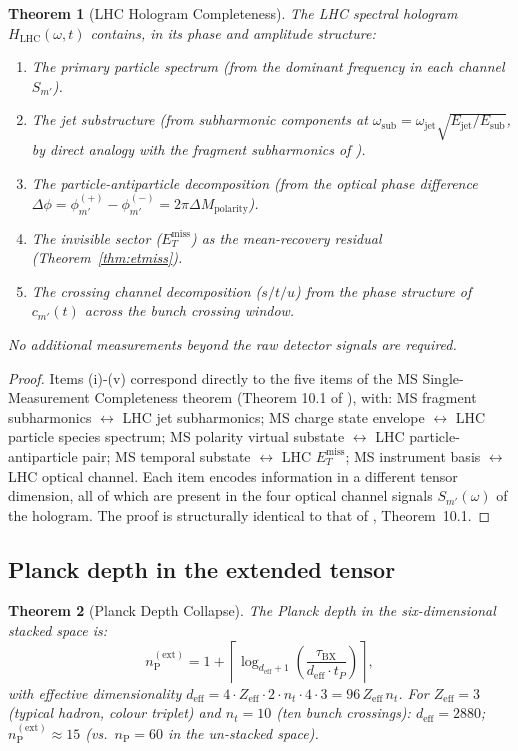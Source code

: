 \documentclass[twocolumn,10pt,a4paper]{article}
\theoremstyle{thmstyle}
\newtheorem{theorem}{Theorem}[section]
\theoremstyle{definition}
\theoremstyle{remark}
\newcommand{\nP}{n_{\mathrm{P}}}
\newcommand{\Hologram}{H_{\mathrm{LHC}}}
\newcommand{\deff}{d_{\mathrm{eff}}}
\newcommand{\ETmiss}{E_{T}^{\mathrm{miss}}}
\begin{document}
\begin{theorem}[LHC Hologram Completeness]
\label{thm:hologram_complete}
The LHC spectral hologram $\Hologram(\omega,t)$ contains, in its phase and
amplitude structure:
\begin{enumerate}[nosep,label=(\roman*)]
\item The primary particle spectrum (from the dominant frequency in each
  channel $S_{m'}$).
\item The jet substructure (from subharmonic components at
  $\omega_\text{sub} = \omega_\text{jet}\sqrt{E_\text{jet}/E_\text{sub}}$,
  by direct analogy with the fragment subharmonics of \citealt{companion:tensor}).
\item The particle-antiparticle decomposition (from the optical phase difference
  $\Delta\phi = \phi_{m'}^{(+)} - \phi_{m'}^{(-)} = 2\pi \Delta M_\text{polarity}$).
\item The invisible sector ($\ETmiss$) as the mean-recovery residual
  (Theorem~\ref{thm:etmiss}).
\item The crossing channel decomposition ($s/t/u$) from the phase
  structure of $c_{m'}(t)$ across the bunch crossing window.
\end{enumerate}
No additional measurements beyond the raw detector signals are required.
\end{theorem}

\begin{proof}
Items (i)-(v) correspond directly to the five items of the MS
Single-Measurement Completeness theorem (Theorem 10.1 of
\citealt{companion:tensor}), with:
MS fragment subharmonics $\leftrightarrow$ LHC jet subharmonics;
MS charge state envelope $\leftrightarrow$ LHC particle species spectrum;
MS polarity virtual substate $\leftrightarrow$ LHC particle-antiparticle pair;
MS temporal substate $\leftrightarrow$ LHC $\ETmiss$;
MS instrument basis $\leftrightarrow$ LHC optical channel.
Each item encodes information in a different tensor dimension, all of which
are present in the four optical channel signals $S_{m'}(\omega)$ of the
hologram.  The proof is structurally identical to that of
\citet{companion:tensor}, Theorem~10.1.
\end{proof}

\subsection{Planck depth in the extended tensor}

\begin{theorem}[Planck Depth Collapse]
\label{thm:planck_collapse}
The Planck depth in the six-dimensional stacked space is:
\begin{equation}
\nP^{(\text{ext})} = 1 + \left\lceil\log_{\deff+1}\!\left(\frac{\tau_{\mathrm{BX}}}
{\deff \cdot t_P}\right)\right\rceil,
\label{eq:planck_ext}
\end{equation}
with effective dimensionality $\deff = 4 \cdot Z_\text{eff} \cdot 2 \cdot
n_t \cdot 4 \cdot 3 = 96\,Z_\text{eff}\,n_t$.
For $Z_\text{eff} = 3$ (typical hadron, colour triplet) and
$n_t = 10$ (ten bunch crossings):
$\deff = 2880$;
$\nP^{(\text{ext})} \approx 15$
(vs.\ $\nP = 60$ in the un-stacked space).
\end{theorem}
\end{document}

